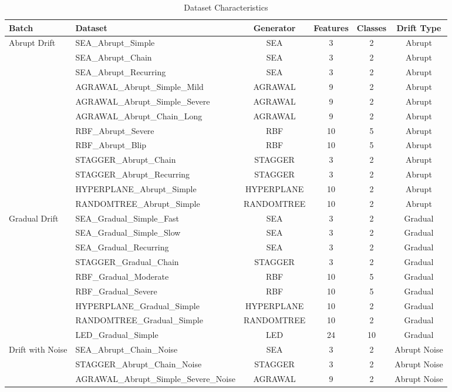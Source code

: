 \begin{table}[htbp]
\centering
\caption{Dataset Characteristics}
\label{tab:datasets}
\footnotesize
\begin{tabular}{llcccc}
\toprule
Batch & Dataset & Generator & Features & Classes & Drift Type \\
\midrule
Abrupt Drift & SEA_Abrupt_Simple & SEA & 3 & 2 & Abrupt \\
 & SEA_Abrupt_Chain & SEA & 3 & 2 & Abrupt \\
 & SEA_Abrupt_Recurring & SEA & 3 & 2 & Abrupt \\
 & AGRAWAL_Abrupt_Simple_Mild & AGRAWAL & 9 & 2 & Abrupt \\
 & AGRAWAL_Abrupt_Simple_Severe & AGRAWAL & 9 & 2 & Abrupt \\
 & AGRAWAL_Abrupt_Chain_Long & AGRAWAL & 9 & 2 & Abrupt \\
 & RBF_Abrupt_Severe & RBF & 10 & 5 & Abrupt \\
 & RBF_Abrupt_Blip & RBF & 10 & 5 & Abrupt \\
 & STAGGER_Abrupt_Chain & STAGGER & 3 & 2 & Abrupt \\
 & STAGGER_Abrupt_Recurring & STAGGER & 3 & 2 & Abrupt \\
 & HYPERPLANE_Abrupt_Simple & HYPERPLANE & 10 & 2 & Abrupt \\
 & RANDOMTREE_Abrupt_Simple & RANDOMTREE & 10 & 2 & Abrupt \\
\midrule
Gradual Drift & SEA_Gradual_Simple_Fast & SEA & 3 & 2 & Gradual \\
 & SEA_Gradual_Simple_Slow & SEA & 3 & 2 & Gradual \\
 & SEA_Gradual_Recurring & SEA & 3 & 2 & Gradual \\
 & STAGGER_Gradual_Chain & STAGGER & 3 & 2 & Gradual \\
 & RBF_Gradual_Moderate & RBF & 10 & 5 & Gradual \\
 & RBF_Gradual_Severe & RBF & 10 & 5 & Gradual \\
 & HYPERPLANE_Gradual_Simple & HYPERPLANE & 10 & 2 & Gradual \\
 & RANDOMTREE_Gradual_Simple & RANDOMTREE & 10 & 2 & Gradual \\
 & LED_Gradual_Simple & LED & 24 & 10 & Gradual \\
\midrule
Drift with Noise & SEA_Abrupt_Chain_Noise & SEA & 3 & 2 & Abrupt Noise \\
 & STAGGER_Abrupt_Chain_Noise & STAGGER & 3 & 2 & Abrupt Noise \\
 & AGRAWAL_Abrupt_Simple_Severe_Noise & AGRAWAL & 9 & 2 & Abrupt Noise \\

\end{tabular}
\end{table}
